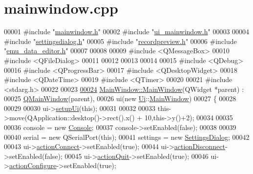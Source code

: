 \hypertarget{a00038_source}{\section{mainwindow.\+cpp}
\label{a00038_source}
}

\begin{DoxyCode}
00001 \textcolor{preprocessor}{#include "\hyperlink{a00039}{mainwindow.h}"}
00002 \textcolor{preprocessor}{#include "\hyperlink{a00052}{ui\_mainwindow.h}"}
00003 
00004 \textcolor{preprocessor}{#include "\hyperlink{a00045}{settingsdialog.h}"}
00005 \textcolor{preprocessor}{#include "\hyperlink{a00043}{recordpreview.h}"}
00006 \textcolor{preprocessor}{#include "\hyperlink{a00036}{emu\_data\_editor.h}"}
00007 
00008 
00009 \textcolor{preprocessor}{#include <QMessageBox>}
00010 \textcolor{preprocessor}{#include <QFileDialog>}
00011 
00012 
00013 
00014 
00015 \textcolor{preprocessor}{#include <QDebug>}
00016 \textcolor{preprocessor}{#include <QProgressBar>}
00017 \textcolor{preprocessor}{#include <QDesktopWidget>}
00018 \textcolor{preprocessor}{#include <QDateTime>}
00019 \textcolor{preprocessor}{#include <QTimer>}
00020 
00021 \textcolor{preprocessor}{#include <stdarg.h>}
00022 
00023 
\hypertarget{a00038_source_l00024}{}\hyperlink{a00006_a8b244be8b7b7db1b08de2a2acb9409db}{00024} \hyperlink{a00006_a8b244be8b7b7db1b08de2a2acb9409db}{MainWindow::MainWindow}(QWidget *parent) :
00025     \hyperlink{a00010}{QMainWindow}(parent),
00026     ui(new \hyperlink{a00055}{Ui}::\hyperlink{a00006}{MainWindow})
00027 \{
00028 
00029 
00030     ui->\hyperlink{a00027_acf4a0872c4c77d8f43a2ec66ed849b58}{setupUi}(\textcolor{keyword}{this});
00031 
00032 
00033     this->move(QApplication::desktop()->rect().x() + 10,this->y()+2);
00034 
00035 
00036         console = \textcolor{keyword}{new} \hyperlink{a00002}{Console};
00037         console->setEnabled(\textcolor{keyword}{false});
00038 
00039 
00040         serial = \textcolor{keyword}{new} QSerialPort(\textcolor{keyword}{this});
00041         settings = \textcolor{keyword}{new} \hyperlink{a00022}{SettingsDialog};
00042 
00043           ui->\hyperlink{a00027_aa0785566311fc48271690fb68b1d4c5f}{actionConnect}->setEnabled(\textcolor{keyword}{true});
00044           ui->\hyperlink{a00027_a8a16b3aef75b279eaaa887152d2f746b}{actionDisconnect}->setEnabled(\textcolor{keyword}{false});
00045           ui->\hyperlink{a00027_a188c243f36a2dbc10e4e2a0ad94273b1}{actionQuit}->setEnabled(\textcolor{keyword}{true});
00046           ui->\hyperlink{a00027_a3860abde3cfd3f6170e28fddde73f11e}{actionConfigure}->setEnabled(\textcolor{keyword}{true});

\end{DoxyCode}
